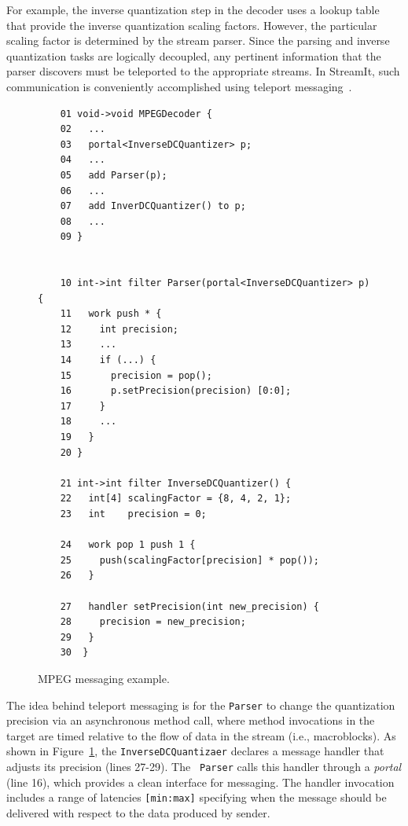 For example, the inverse quantization step in the decoder uses a
lookup table that provide the inverse quantization scaling factors.
However, the particular scaling factor is determined by the stream
parser. Since the parsing and inverse quantization tasks are logically
decoupled, any pertinent information that the parser discovers must be
teleported to the appropriate streams.  In StreamIt, such
communication is conveniently accomplished using teleport
messaging~\cite{thies05ppopp}.

\begin{figure}[t]
  \begin{scriptsize}
    \begin{verbatim}
	01 void->void MPEGDecoder {
	02   ...
	03   portal<InverseDCQuantizer> p;
	04   ...
	05   add Parser(p);
	06   ...
	07   add InverDCQuantizer() to p;
	08   ...
	09 }
	 
	 
	10 int->int filter Parser(portal<InverseDCQuantizer> p) {
	11   work push * {
	12     int precision;
	13     ...
	14     if (...) {
	15       precision = pop();
	16       p.setPrecision(precision) [0:0];
	17     }
	18     ...
	19   }
	20 }

	21 int->int filter InverseDCQuantizer() {
	22   int[4] scalingFactor = {8, 4, 2, 1};
	23   int    precision = 0;

	24   work pop 1 push 1 {
	25     push(scalingFactor[precision] * pop());
	26   }

	27   handler setPrecision(int new_precision) {
	28     precision = new_precision;
	29   }
	30  }
    \end{verbatim}
  \end{scriptsize}
  \caption{MPEG messaging example.}
  \label{fig:messaging}
\end{figure}

The idea behind teleport messaging is for the {\tt Parser} to change
the quantization precision via an asynchronous method call, where
method invocations in the target are timed relative to the flow of
data in the stream (i.e., macroblocks). As shown in
Figure~\ref{fig:messaging}, the {\tt InverseDCQuantizaer} declares a
message handler that adjusts its precision (lines 27-29). The {\tt
Parser} calls this handler through a {\it portal} (line 16), which
provides a clean interface for messaging.  The handler invocation
includes a range of latencies {\tt [min:max]} specifying when the
message should be delivered with respect to the data produced by
sender.

